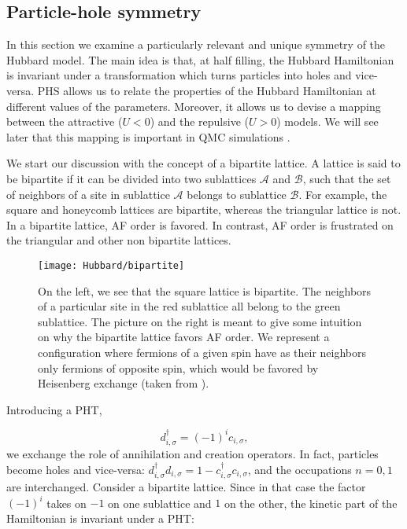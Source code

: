 \subsection{Particle-hole symmetry}

In this section we examine a particularly relevant and unique symmetry of the Hubbard model.
The main idea is that, at half filling, the Hubbard Hamiltonian is invariant under a transformation which turns particles into holes and vice-versa.
\ac{PHS} allows us to relate the properties of the Hubbard Hamiltonian at different values of the parameters.
Moreover, it allows us to devise a mapping between the attractive ($U < 0$) and the repulsive ($U > 0$) models.
We will see later that this mapping is important in QMC simulations \cite{alavi_quantum_2016}.

We start our discussion with the concept of a bipartite lattice.
A lattice is said to be bipartite if it can be divided into two sublattices $\mathcal{A}$ and $\mathcal{B}$, such that the set of neighbors of a site in sublattice $\mathcal{A}$ belongs to sublattice $\mathcal{B}$.
For example, the square and honeycomb lattices are bipartite, whereas the triangular lattice is not.
In a bipartite lattice, \ac{AF} order is favored.
In contrast, AF order is frustrated on the triangular and other non bipartite lattices.

\begin{figure}[H]\label{fig:bipartite}
\centering
\texttt{[image: Hubbard/bipartite]}
\caption[Bipartite lattices and antiferromagnetic order.]{On the left, we see that the square lattice is bipartite.
The neighbors of a particular site in the red sublattice all belong to the green sublattice.
The picture on the right is meant to give some intuition on why the bipartite lattice favors \ac{AF} order.
We represent a configuration where fermions of a given spin have as their neighbors only fermions of opposite spin, which would be favored by Heisenberg exchange (taken from \cite{alavi_quantum_2016}). }
\end{figure}

Introducing a \ac{PHT},

\begin{equation}\label{eq:PHT}
d_{ i, \sigma}^\dagger = (-1)^i c_{i, \sigma} ,
\end{equation}
we exchange the role of annihilation and creation operators.
In fact, particles become holes and vice-versa: $d_{ i, \sigma}^\dagger d_{ i, \sigma} = 1 - c_{ i, \sigma}^\dagger c_{ i, \sigma} $, and the occupations $n = 0, 1$ are interchanged.
Consider a bipartite lattice.
Since in that case the factor $(-1)^i$ takes on $-1$ on one sublattice and $1$ on the other, the kinetic part of the Hamiltonian is invariant under a \ac{PHT}:

